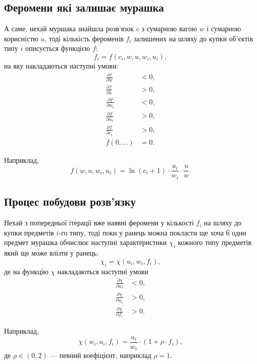 \documentclass[a4paper, 12pt]{article}
\numberwithin{equation}{section}
\begin{document}
\subsection{Феромени які залишає мурашка}

А саме, нехай муршака знайшла розв'язок $c$ з сумарною вагою $w$ і сумарною корисністю $u$, тоді кількість фероменів $f_i$ залишених на шляху до купки об'єктів типу $i$ описується функцією $f$:
\begin{equation}
    f_i = f(c_i, w, u, w_i, u_i),
\end{equation}
на яку накладаються наступні умови:
\begin{align}
    \frac{\partial f}{\partial w} &< 0, \\
    \frac{\partial f}{\partial u} &> 0, \\
    \frac{\partial f}{\partial w_i} &< 0, \\
    \frac{\partial f}{\partial u_i} &> 0, \\
    \frac{\partial f}{\partial c_i} &> 0, \\
    f(0, \ldots) &= 0.
\end{align}

Наприклад, 
\begin{equation}
    f(w, u, w_i, u_i) = \ln (c_i + 1) \cdot \frac{u_i}{w_i} \cdot \frac{u}{w}.
\end{equation}

\subsection{Процес побудови розв'язку}

Нехай з попередньої ітерації вже наявні феромени у кількості $f_i$ на шляху до купки предметів $i$-го типу, тоді поки у ранець можна покласти ще хоча б один предмет мурашка обчислює наступні характеристики $\chi_i$ кожного типу предметів який ще може влізти у ранець:
\begin{equation}
    \chi_i = \chi(u_i, w_i, f_i),
\end{equation}
де на функцію $\chi$ накладаються наступні умови
\begin{align}
    \frac{\partial \chi}{\partial w_i} &< 0, \\
    \frac{\partial \chi}{\partial u_i} &> 0, \\
    \frac{\partial \chi}{\partial f_i} &> 0.
\end{align}

Наприклад,
\begin{equation}
    \chi(w_i, u_i, f_i) = \frac{u_i}{w_i} \cdot (1 + \rho \cdot f_i),
\end{equation}
де $\rho \in (0, 2)$ --- певний коефіцієнт, наприклад $\rho = 1$. \medskip
\end{document}
